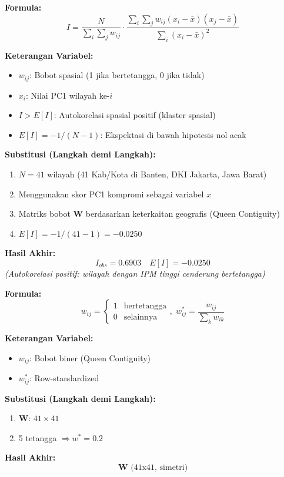 \documentclass[11pt,a4paper]{article}
\begin{document}
\begin{tcolorbox}[formula_box, title={20. Statistik Global Moran's $I$}]
\textbf{Formula:}
\[ I = \frac{N}{\sum_i\sum_j w_{ij}} \cdot \frac{\sum_i\sum_j w_{ij}(x_i-\bar{x})(x_j-\bar{x})}{\sum_i(x_i-\bar{x})^2} \]

\textbf{Keterangan Variabel:}
\begin{itemize}
  \item $w_{ij}$: Bobot spasial (1 jika bertetangga, 0 jika tidak)
  \item $x_i$: Nilai PC1 wilayah ke-$i$
  \item $I > E[I]$: Autokorelasi spasial positif (klaster spasial)
  \item $E[I] = -1/(N-1)$: Ekspektasi di bawah hipotesis nol acak
\end{itemize}

\textbf{Substitusi (Langkah demi Langkah):}
\begin{enumerate}
  \item $N = 41$ wilayah (41 Kab/Kota di Banten, DKI Jakarta, Jawa Barat)
  \item Menggunakan skor PC1 kompromi sebagai variabel $x$
  \item Matriks bobot $\mathbf{W}$ berdasarkan keterkaitan geografis (Queen Contiguity)
  \item $E[I] = -1/(41-1) = -0.0250$
\end{enumerate}

\textbf{Hasil Akhir:}
\[ I_{obs} = 0.6903 \quad E[I] = -0.0250 \]
\textit{(Autokorelasi positif: wilayah dengan IPM tinggi cenderung bertetangga)}
\end{tcolorbox}

\begin{tcolorbox}[formula_box, title={26. Matriks Pembobot Spasial}]
\textbf{Formula:}
\[ w_{ij}=\begin{cases}1&\text{bertetangga}\\0&\text{selainnya}\end{cases},\; w_{ij}^*=\frac{w_{ij}}{\sum_k w_{ik}} \]

\textbf{Keterangan Variabel:}
\begin{itemize}
  \item $w_{ij}$: Bobot biner (Queen Contiguity)
  \item $w_{ij}^*$: Row-standardized
\end{itemize}

\textbf{Substitusi (Langkah demi Langkah):}
\begin{enumerate}
  \item $\mathbf{W}$: $41\times41$
  \item 5 tetangga $\Rightarrow w^*=0.2$
\end{enumerate}

\textbf{Hasil Akhir:}
\[ \mathbf{W} \text{ (41x41, simetri)} \]
\end{tcolorbox}
\end{document}
